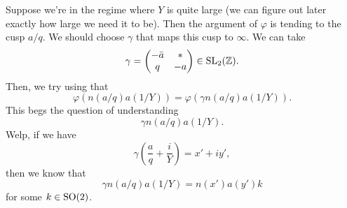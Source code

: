 \documentclass[reqno]{amsart} 
\begin{document}
Suppose we're in the regime where $Y$ is quite large (we can figure out later exactly how large we need it to be).  Then the argument of $\varphi$ is tending to the cusp $a/q$.  We should choose $\gamma$ that maps this cusp to $\infty$.  We can take
\begin{equation*}
  \gamma =
  \begin{pmatrix}
    -\bar{a}    & \ast \\
    q & -a \\
  \end{pmatrix} \in \operatorname{SL}_2(\mathbb{Z}).
\end{equation*}
Then, we try using that
\begin{equation*}
  \varphi(n(a/q) a(1/Y)) = \varphi(\gamma n(a/q) a(1/Y)).
\end{equation*}
This begs the question of understanding
\begin{equation*}
  \gamma n(a/q) a(1/Y).
\end{equation*}
Welp, if we have
\begin{equation*}
  \gamma \left( \frac{a}{q} + \frac{i}{Y} \right) = x' + i y ',
\end{equation*}
then we know that
\begin{equation*}
  \gamma n(a/q) a(1/Y) = n(x') a(y') k
\end{equation*}
for some $k \in \operatorname{SO}(2)$.
\end{document}
